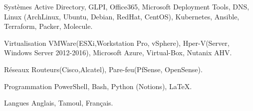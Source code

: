 

\begin{cvskills}

  \cvskill
    {Systèmes} %
    {Active Directory, GLPI, Office365, Microsoft Deployment Tools, DNS, Linux (ArchLinux, Ubuntu, Debian, RedHat, CentOS), Kubernetes, Ansible, Terraform, Packer, Molecule.} %

  \cvskill
    {Virtualisation} %
    {VMWare(ESXi,Workstation Pro, vSphere), Hper-V(Server, Windows Server 2012-2016), Microsoft Azure, Virtual-Box, Nutanix AHV.} %

  \cvskill
    {Réseaux} %
    {Routeurs(Cisco,Alcatel), Pare-feu(PfSense, OpenSense).} %

  \cvskill
    {Programmation} %
    {PowerShell, Bash, Python (Notions), LaTeX.} %

  \cvskill
    {Langues} %
    {Anglais, Tamoul, Français.} %

\end{cvskills}
